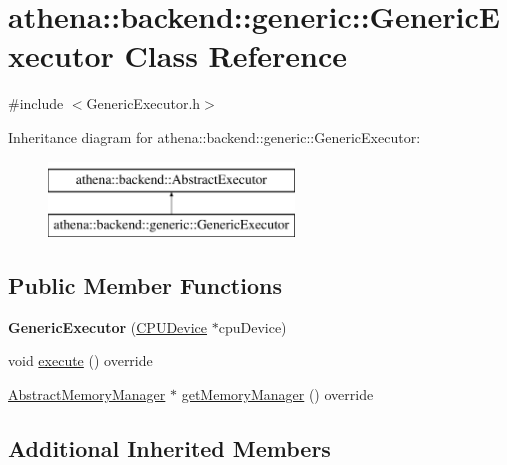 \hypertarget{classathena_1_1backend_1_1generic_1_1_generic_executor}{}\section{athena\+:\+:backend\+:\+:generic\+:\+:Generic\+Executor Class Reference}
\label{classathena_1_1backend_1_1generic_1_1_generic_executor}


{\ttfamily \#include $<$Generic\+Executor.\+h$>$}

Inheritance diagram for athena\+:\+:backend\+:\+:generic\+:\+:Generic\+Executor\+:\begin{figure}[H]
\begin{center}
\leavevmode
\includegraphics[height=2.000000cm]{classathena_1_1backend_1_1generic_1_1_generic_executor}
\end{center}
\end{figure}
\subsection*{Public Member Functions}
\begin{DoxyCompactItemize}
\item 
\mbox{\label{classathena_1_1backend_1_1generic_1_1_generic_executor_a1261a552f5a1168a34bf31ecefdcaead}} 
{\bfseries Generic\+Executor} (\mbox{\hyperlink{classathena_1_1backend_1_1generic_1_1_c_p_u_device}{C\+P\+U\+Device}} $\ast$cpu\+Device)
\item 
void \mbox{\hyperlink{classathena_1_1backend_1_1generic_1_1_generic_executor_a38b56c284050d31198b28fcb6595bc73}{execute}} () override
\item 
\mbox{\hyperlink{classathena_1_1backend_1_1_abstract_memory_manager}{Abstract\+Memory\+Manager}} $\ast$ \mbox{\hyperlink{classathena_1_1backend_1_1generic_1_1_generic_executor_a0560a1dfc0c70ebef0b5be26bb82b9c5}{get\+Memory\+Manager}} () override
\end{DoxyCompactItemize}
\subsection*{Additional Inherited Members}


